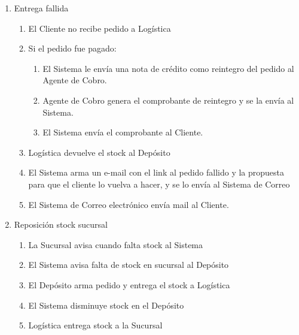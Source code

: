 \begin{enumerate}
\item Entrega fallida
  \begin{enumerate}
    \item El Cliente no recibe pedido a Logística \label{itm:f-cliente-no-recibe-logistica}
    \item Si el pedido fue pagado:
    \begin{enumerate}
      \item El Sistema le envía una nota de crédito como reintegro del pedido al Agente de Cobro. \label{itm:f-sistema-reintegra-agentecobro}
      \item Agente de Cobro genera el comprobante de reintegro y se la envía al Sistema. \label{itm:f-agentecobro-comprobante-reintegro-sistema}
      \item El Sistema envía el comprobante al Cliente. \label{itm:f-sistema-comprobante-reintegro-cliente}
    \end{enumerate}

    \item Logística devuelve el stock al Depósito \label{itm:f-logistica-devuelve-stock-deposito}
    \item El Sistema arma un e-mail con el link al pedido fallido y la propuesta para que el cliente lo vuelva a hacer, y se lo envía al Sistema de Correo \label{itm:f-sistema-link-rehacer-correoelectronico}
    \item El Sistema de Correo electrónico envía mail al Cliente. \label{itm:correoelectronico-mail-cliente}
  \end{enumerate}

\item Reposición stock sucursal
  \begin{enumerate}
    \item La Sucursal avisa cuando falta stock al Sistema \label{itm:f-sucursal-falta-stock-sistema}
    \item El Sistema avisa falta de stock en sucursal al Depósito \label{itm:f-sistema-falta-stock-deposito}
    \item El Depósito arma pedido y entrega el stock a Logística \label{itm:f-deposito-entrega-pedido-logistica}
    \item El Sistema disminuye stock en el Depósito \label{itm:f-sistema-disminuye-stock-deposito}
    \item Logística entrega stock a la Sucursal \label{itm:f-logistica-entrega-stock-sucursal}
  \end{enumerate}


\end{enumerate}
